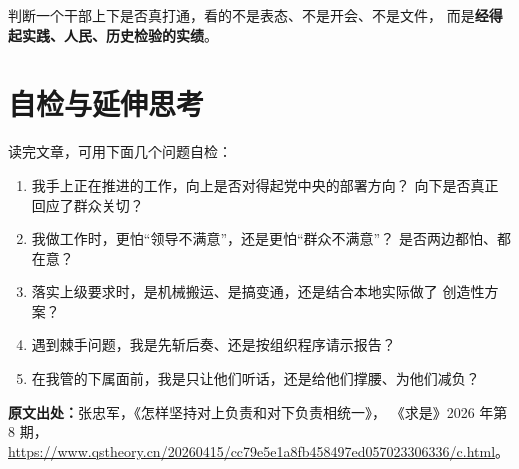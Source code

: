 \documentclass[11pt,a4paper]{ctexart}
\begin{document}
\begin{keypointblock}
判断一个干部上下是否真打通，看的不是表态、不是开会、不是文件，
而是\textbf{经得起实践、人民、历史检验的实绩}。
\end{keypointblock}

\section{自检与延伸思考}

读完文章，可用下面几个问题自检：

\begin{enumerate}[label=\textbf{Q\arabic*.}]
  \item 我手上正在推进的工作，向上是否对得起党中央的部署方向？
        向下是否真正回应了群众关切？
  \item 我做工作时，更怕``领导不满意''，还是更怕``群众不满意''？
        是否两边都怕、都在意？
  \item 落实上级要求时，是机械搬运、是搞变通，还是结合本地实际做了
        创造性方案？
  \item 遇到棘手问题，我是先斩后奏、还是按组织程序请示报告？
  \item 在我管的下属面前，我是只让他们听话，还是给他们撑腰、为他们减负？
\end{enumerate}

\bigskip
\noindent\textbf{原文出处：}张忠军，《怎样坚持对上负责和对下负责相统一》，
《求是》2026 年第 8 期，
\url{https://www.qstheory.cn/20260415/cc79e5e1a8fb458497ed057023306336/c.html}。
\end{document}
